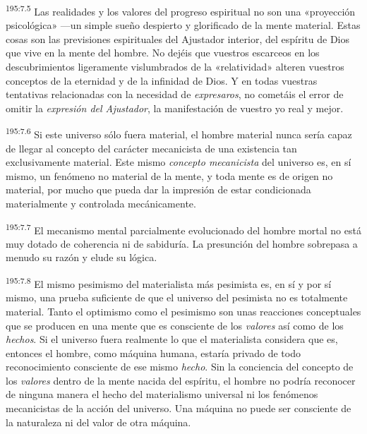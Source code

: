 \par 
\textsuperscript{195:7.5} Las realidades y los valores del progreso espiritual no son una «proyección psicológica» ---un simple sueño despierto y glorificado de la mente material. Estas cosas son las previsiones espirituales del Ajustador interior, del espíritu de Dios que vive en la mente del hombre. No dejéis que vuestros escarceos en los descubrimientos ligeramente vislumbrados de la «relatividad» alteren vuestros conceptos de la eternidad y de la infinidad de Dios. Y en todas vuestras tentativas relacionadas con la necesidad de \textit{expresaros}, no cometáis el error de omitir la \textit{expresión del Ajustador}, la manifestación de vuestro yo real y mejor.

\par 
\textsuperscript{195:7.6} Si este universo sólo fuera material, el hombre material nunca sería capaz de llegar al concepto del carácter mecanicista de una existencia tan exclusivamente material. Este mismo \textit{concepto mecanicista} del universo es, en sí mismo, un fenómeno no material de la mente, y toda mente es de origen no material, por mucho que pueda dar la impresión de estar condicionada materialmente y controlada mecánicamente.

\par 
\textsuperscript{195:7.7} El mecanismo mental parcialmente evolucionado del hombre mortal no está muy dotado de coherencia ni de sabiduría. La presunción del hombre sobrepasa a menudo su razón y elude su lógica.

\par 
\textsuperscript{195:7.8} El mismo pesimismo del materialista más pesimista es, en sí y por sí mismo, una prueba suficiente de que el universo del pesimista no es totalmente material. Tanto el optimismo como el pesimismo son unas reacciones conceptuales que se producen en una mente que es consciente de los \textit{valores} así como de los \textit{hechos}. Si el universo fuera realmente lo que el materialista considera que es, entonces el hombre, como máquina humana, estaría privado de todo reconocimiento consciente de ese mismo \textit{hecho}. Sin la conciencia del concepto de los \textit{valores} dentro de la mente nacida del espíritu, el hombre no podría reconocer de ninguna manera el hecho del materialismo universal ni los fenómenos mecanicistas de la acción del universo. Una máquina no puede ser consciente de la naturaleza ni del valor de otra máquina.

